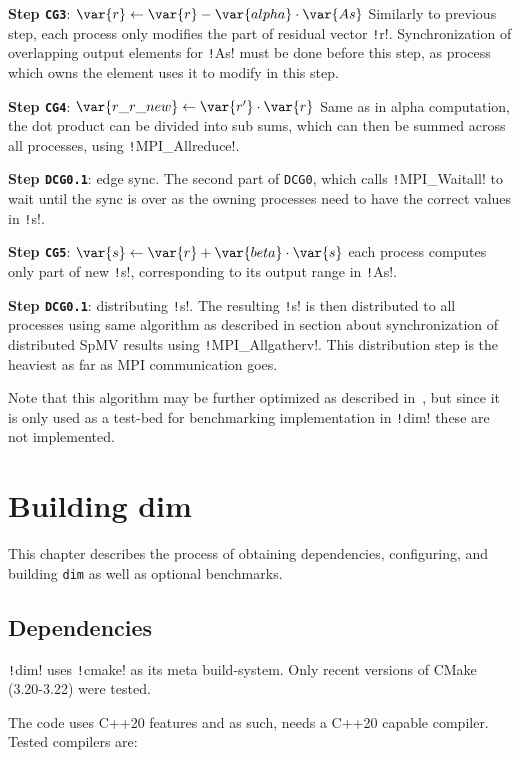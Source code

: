 \documentclass[thesis=M,english]{FITthesis}[2019/12/23]
\newcommand{\csre}[1]{\texttt!#1!}
\begin{document}
\textbf{Step \texttt{CG3}}: $\var{r} \gets \var{r} - \var{alpha} \cdot \var{As}$ Similarly to previous step, each process
only modifies the part of residual vector \csre{r}. Synchronization of overlapping
output elements for \csre{As} must be done before this step, as process which owns the
element uses it to modify  in this step.

\textbf{Step \texttt{CG4}}: $\var{r\_r\_new} \gets \var{r'} \cdot \var{r}$ Same as in alpha computation, the dot product
can be divided into sub sums, which can then be summed across all processes, using
\csre{MPI_Allreduce}.

\textbf{Step \texttt{DCG0.1}}: edge sync. The second part of \texttt{DCG0}, which calls \csre{MPI_Waitall}
to wait until the sync is over as the owning processes need to have the correct values in \csre{s}.

\textbf{Step \texttt{CG5}}: $\var{s} \gets \var{r} + \var{beta} \cdot \var{s}$ each process computes only part of new
\csre{s}, corresponding to its output range in \csre{As}. 

\textbf{Step \texttt{DCG0.1}}: distributing \csre{s}. The resulting \csre{s} is
then distributed to all processes using same algorithm as described in section
about synchronization of distributed SpMV results using \csre{MPI_Allgatherv}.
This distribution step is the heaviest as far as MPI communication goes.

Note that this algorithm may be further optimized as described in~\cite{distCGwRedSync}, but
since it is only used as a test-bed for benchmarking implementation in \csre{dim} these are not
implemented.

\chapter{Building dim}

This chapter describes the process of obtaining dependencies, configuring, and building \texttt{dim} as well
as optional benchmarks.

\section{Dependencies}\label{bdim:deps}

\csre{dim} uses \csre{cmake} as its meta build-system. Only recent versions of CMake (3.20-3.22) were tested.

The code uses C++20 features and as such, needs a C++20 capable compiler. Tested compilers
are:
\end{document}
